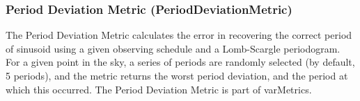 \subsubsection{Period Deviation Metric (PeriodDeviationMetric)}

The Period Deviation Metric calculates the error in recovering the correct period of sinusoid using a given observing schedule and a Lomb-Scargle periodogram. For a given point in the sky, a series of periods are randomly selected (by default, 5 periods), and the metric returns the worst period deviation, and the period at which this occurred. The Period Deviation Metric is part of varMetrics.





















